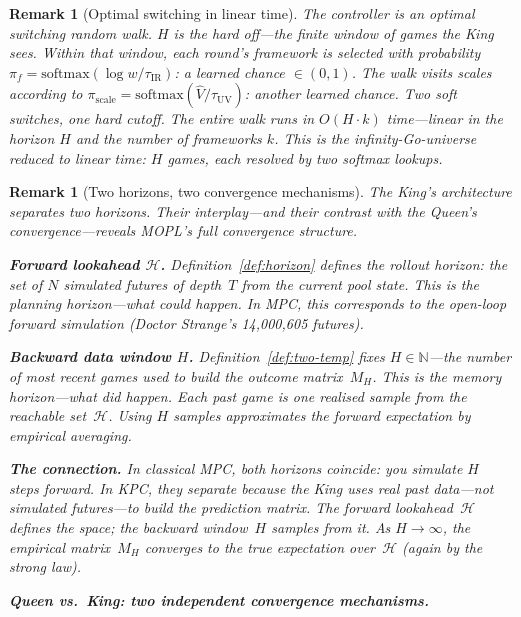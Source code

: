 \documentclass[11pt,a4paper]{article}
\newtheorem{remark}[theorem]{Remark}
\newcommand{\N}{\mathbb{N}}
\newcommand{\cH}{\mathcal{H}}
\newcommand{\softmax}{\mathrm{softmax}}
\begin{document}
\begin{remark}[Optimal switching in linear time]\label{rem:switching}
The controller is an \emph{optimal switching random walk}.
$H$ is the hard off---the finite window of games the King sees.
Within that window, each round's framework is selected with
probability $\pi_f = \softmax(\log w / \tau_{\mathrm{IR}})$:
a learned chance $\in (0,1)$.
The walk visits scales according to
$\pi_{\mathrm{scale}} = \softmax(\hat{V} / \tau_{\mathrm{UV}})$:
another learned chance.
Two soft switches, one hard cutoff.
The entire walk runs in $O(H \cdot k)$ time---linear in
the horizon $H$ and the number of frameworks $k$.
This is the infinity-Go-universe reduced to linear time:
$H$ games, each resolved by two softmax lookups.
\end{remark}

\begin{remark}[Two horizons, two convergence mechanisms]%
\label{rem:two-horizons}
The King's architecture separates two horizons.
Their interplay---and their contrast with the Queen's
convergence---reveals MOPL's full convergence structure.

\medskip\noindent
\textbf{Forward lookahead $\cH$.}\;
Definition~\ref{def:horizon} defines the \emph{rollout horizon}:
the set of $N$ simulated futures of depth~$T$
from the current pool state.
This is the \emph{planning} horizon---what \emph{could} happen.
In MPC, this corresponds to the open-loop forward simulation
(Doctor Strange's 14{,}000{,}605 futures).

\medskip\noindent
\textbf{Backward data window $H$.}\;
Definition~\ref{def:two-temp} fixes $H \in \N$---the number
of most recent games used to build the outcome matrix~$M_H$.
This is the \emph{memory} horizon---what \emph{did} happen.
Each past game is one realised sample from the
reachable set~$\cH$.
Using $H$ samples approximates the forward expectation
by empirical averaging.

\medskip\noindent
\textbf{The connection.}\;
In classical MPC, both horizons coincide: you simulate
$H$ steps forward.
In KPC, they separate because the King uses \emph{real}
past data---not simulated futures---to build the
prediction matrix.
The forward lookahead~$\cH$ defines the space;
the backward window~$H$ samples from it.
As $H \to \infty$, the empirical matrix~$M_H$
converges to the true expectation over~$\cH$
(again by the strong law).

\medskip\noindent
\textbf{Queen vs.\ King: two independent convergence mechanisms.}


\end{remark}
\end{document}
